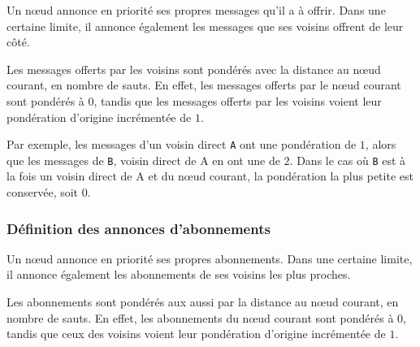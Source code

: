 Un n\oe ud annonce en priorité ses propres messages qu'il a à offrir. Dans une certaine limite, il annonce également les messages que ses voisins offrent de leur c\^oté.

Les messages offerts par les voisins sont pondérés avec la distance au n\oe ud courant, en nombre de sauts. En effet, les messages offerts par le n\oe ud courant sont pondérés à $0$, tandis que les messages offerts par les voisins voient leur pondération d'origine incrémentée de $1$.

Par exemple, les messages d'un voisin direct \texttt{A} ont une pondération de $1$, alors que les messages de \texttt{B}, voisin direct de \textsf{A} en ont une de $2$. Dans le cas où \texttt{B} est à la fois un voisin direct de \textsf{A} et du n\oe ud courant, la pondération la plus petite est conservée, soit $0$.




\subsubsection{Définition des annonces d'abonnements}

Un n\oe ud annonce en priorité ses propres abonnements. Dans une certaine limite, il annonce également les abonnements de ses voisins les plus proches.

Les abonnements sont pondérés aux aussi par la distance au n\oe ud courant, en nombre de sauts. En effet, les abonnements du n\oe ud courant sont pondérés à $0$, tandis que ceux des voisins voient leur pondération d'origine incrémentée de $1$.


